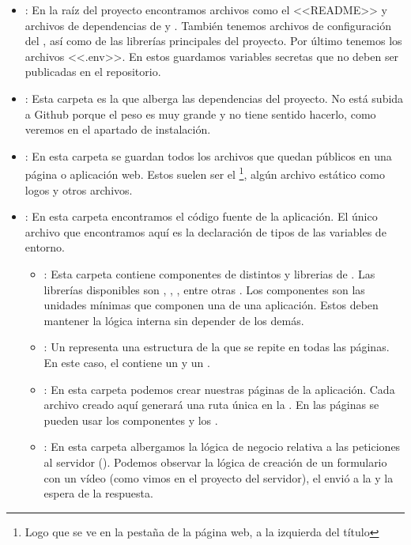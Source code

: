 \begin{itemize}

  \item \prog{/}: En la raíz del proyecto encontramos archivos como el <<README>> y archivos de dependencias de  y . También tenemos archivos de configuración del , así como de las librerías principales del proyecto. Por último tenemos los archivos <<.env>>. En estos guardamos variables secretas que no deben ser publicadas en el repositorio.

  \item {}: Esta carpeta es la que alberga las dependencias del proyecto. No está subida a Github porque el peso es muy grande y no tiene sentido hacerlo, como veremos en el apartado de instalación.

  \item {}: En esta carpeta se guardan todos los archivos que quedan públicos en una página o aplicación web. Estos suelen ser el \footnote{Logo que se ve en la pestaña de la página web, a la izquierda del título}, algún archivo estático como logos y otros archivos.

  \item {}: En esta carpeta encontramos el código fuente de la aplicación. El único archivo que encontramos aquí es la declaración de tipos de las variables de entorno.
        \begin{itemize}
          \item {}: Esta carpeta contiene componentes de distintos  y librerias de . Las librerías disponibles son , , , entre otras . Los componentes son las unidades mínimas que componen una  de una aplicación. Estos deben mantener la lógica interna sin depender de los demás.

          \item {}: Un  representa una estructura de la  que se repite en todas las páginas. En este caso, el  contiene un  y un .

          \item {}: En esta carpeta podemos crear nuestras páginas de la aplicación. Cada archivo creado aquí generará una ruta única en la . En las páginas se pueden usar los componentes y los .

          \item {}: En esta carpeta albergamos la lógica de negocio relativa a las peticiones  al servidor (). Podemos observar la lógica de creación de un formulario con un vídeo (como vimos en el proyecto del servidor), el envió a la  y la espera de la respuesta.
        \end{itemize}

\end{itemize}

